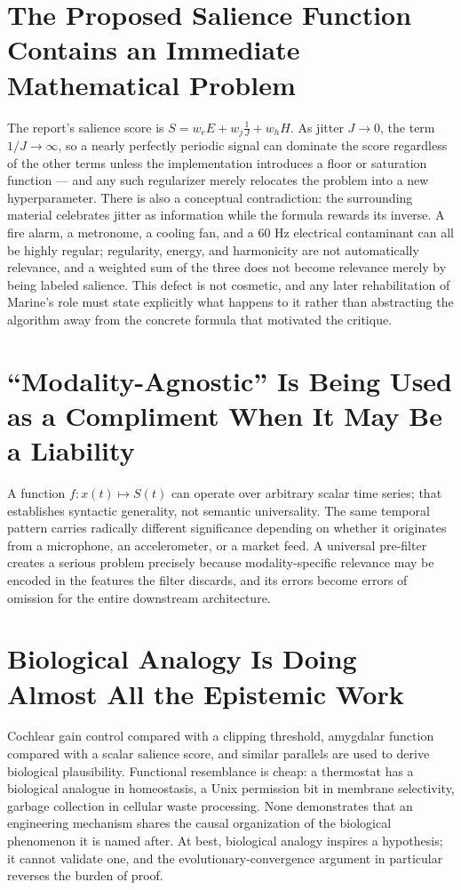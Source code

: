 \documentclass[12pt]{article}
\begin{document}
\section{The Proposed Salience Function Contains an Immediate Mathematical Problem}

The report's salience score is $S=w_eE+w_j\tfrac{1}{J}+w_hH$. As jitter $J\to0$, the term $1/J\to\infty$, so a nearly perfectly periodic signal can dominate the score regardless of the other terms unless the implementation introduces a floor or saturation function — and any such regularizer merely relocates the problem into a new hyperparameter. There is also a conceptual contradiction: the surrounding material celebrates jitter as information while the formula rewards its inverse. A fire alarm, a metronome, a cooling fan, and a 60 Hz electrical contaminant can all be highly regular; regularity, energy, and harmonicity are not automatically relevance, and a weighted sum of the three does not become relevance merely by being labeled salience. This defect is not cosmetic, and any later rehabilitation of Marine's role must state explicitly what happens to it rather than abstracting the algorithm away from the concrete formula that motivated the critique.

\section{``Modality-Agnostic'' Is Being Used as a Compliment When It May Be a Liability}

A function $f:x(t)\mapsto S(t)$ can operate over arbitrary scalar time series; that establishes syntactic generality, not semantic universality. The same temporal pattern carries radically different significance depending on whether it originates from a microphone, an accelerometer, or a market feed. A universal pre-filter creates a serious problem precisely because modality-specific relevance may be encoded in the features the filter discards, and its errors become errors of omission for the entire downstream architecture.

\section{Biological Analogy Is Doing Almost All the Epistemic Work}

Cochlear gain control compared with a clipping threshold, amygdalar function compared with a scalar salience score, and similar parallels are used to derive biological plausibility. Functional resemblance is cheap: a thermostat has a biological analogue in homeostasis, a Unix permission bit in membrane selectivity, garbage collection in cellular waste processing. None demonstrates that an engineering mechanism shares the causal organization of the biological phenomenon it is named after. At best, biological analogy inspires a hypothesis; it cannot validate one, and the evolutionary-convergence argument in particular reverses the burden of proof.
\end{document}
